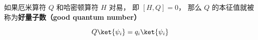
\begin{definition}{}
如果厄米算符 $Q$ 和哈密顿算符 $H$ 对易， 即 $[H, Q] = 0$， 那么 $Q$ 的本征值就被称为\textbf{好量子数（good quantum number）}
\end{definition}

\begin{equation}
Q \ket{\psi_i} = q_i \ket{\psi_i}
\end{equation}
